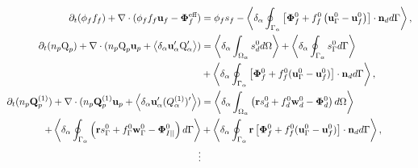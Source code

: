 \begin{align}
    \pddt (\phi_f f_f)
    +\div (\phi_f f_f \textbf{u}_f - \mathbf{\Phi}_f^\text{eff})
    &= 
    \phi_f s_f
    - \pSavg{\left[
        \mathbf{\Phi}_f^0
        + f_f^0
        \left(
            \textbf{u}_\Gamma^0
            - \textbf{u}_f^0
        \right)
    \right]
    \cdot \textbf{n}_d} ,
    \label{eq:avg_hybrid_dt_chi_f}\\
        \pddt (n_p\text Q_p)
        + \div (n_p \text Q_p \textbf{u}_p + \pavg{\textbf{u}_\alpha' \text Q_\alpha'})
        &= \pOavg{ s_d^0 }
        + \pSavg{ s_\Gamma^0 }\nonumber\\
        &+ \pSavg{ \left[\mathbf{\Phi}_f^0 + f_f^0 (\textbf{u}_\Gamma^0-\textbf{u}_f^0) \right] \cdot \textbf{n}_d },
        \label{eq:avg_hybrid_q}
        \\
        \pddt (n_p\textbf{Q}_p^{(1)})
        + \div (n_p \textbf{Q}_p^{(1)} \textbf{u}_p + \pavg{\textbf{u}_\alpha' (Q_\alpha^{(1)})'})
        &=\pOavg{ \left(
            \textbf{r} s_d^0         
            + f_d^0  \textbf{w}_d^0 
            - \mathbf{\Phi}_d^0
        \right) }\nonumber\\
        + \pSavg{ \left(
            \textbf{r}s_\Gamma^0
            + f_\Gamma^0 \textbf{w}_\Gamma^0
            - \mathbf{\Phi}_{I||}^0
        \right) }
        &+ \pSavg{ \textbf{r} \left[
            \mathbf{\Phi}_f^0
            + f_f^0 (\textbf{u}_\Gamma^0-\textbf{u}_f^0)
        \right]\cdot \textbf{n}_d  },
        \label{eq:avg_hybrid_q_1}
        \\\nonumber
        \vdots
\end{align}
